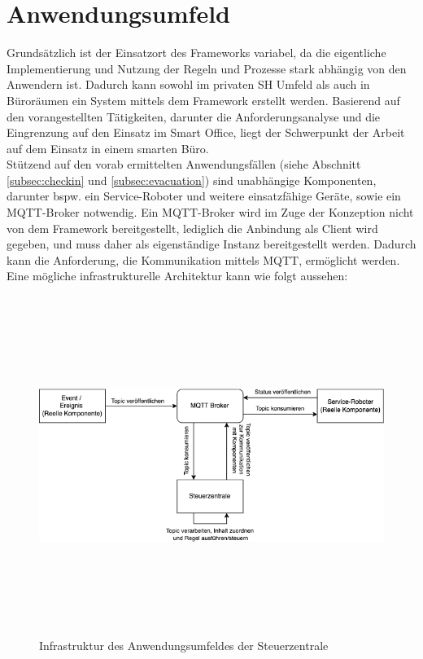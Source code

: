 \section{Anwendungsumfeld}
\label{sec:anwendungsumfeld}
    Grundsätzlich ist der Einsatzort des Frameworks variabel, da die eigentliche Implementierung und Nutzung der Regeln und Prozesse stark 
    abhängig von den Anwendern ist. Dadurch kann sowohl im privaten \acl{SH} Umfeld als auch in Büroräumen ein System mittels dem 
    Framework erstellt werden. Basierend auf den vorangestellten Tätigkeiten, darunter die Anforderungsanalyse und die Eingrenzung auf den 
    Einsatz im Smart Office, liegt der Schwerpunkt der Arbeit auf dem Einsatz in einem smarten Büro. 
    \\
    \linebreak
    Stützend auf den vorab ermittelten Anwendungsfällen (siehe Abschnitt \ref{subsec:checkin} und \ref{subsec:evacuation}) sind unabhängige 
    Komponenten, darunter bspw. ein Service-Roboter und weitere einsatzfähige Geräte, sowie ein \acs{MQTT}-Broker notwendig. Ein \acs{MQTT}-Broker 
    wird im Zuge der Konzeption nicht von dem Framework bereitgestellt, lediglich die Anbindung als Client wird gegeben, und muss daher als eigenständige 
    Instanz bereitgestellt werden. Dadurch kann die Anforderung, die Kommunikation mittels \acs{MQTT}, ermöglicht werden. Eine mögliche infrastrukturelle 
    Architektur kann wie folgt aussehen: 
    \begin{figure}[hbt!]
        \centering
        \includegraphics[width=14cm,height=11cm,keepaspectratio]{images/Systemarchitektur.png}
        \caption{Infrastruktur des Anwendungsumfeldes der Steuerzentrale}
        \label{fig:infrastructure}
    \end{figure}


